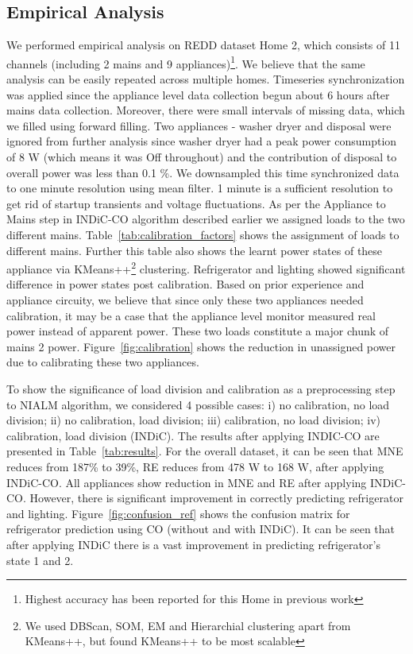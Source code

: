 \documentclass[conference]{IEEEtran}
\newcommand{\figref}[1]{Figure~\ref{#1}}
\newcommand{\tabref}[1]{Table~\ref{#1}}
\begin{document}
\subsection{Empirical Analysis}
\noindent We performed empirical analysis on REDD dataset Home 2, which consists of 11 channels (including 2 mains and 9 appliances)\footnote{Highest accuracy has been reported for this Home in previous work\cite{redd}}. We believe that the same analysis can be easily repeated across multiple homes. Timeseries synchronization was applied since the appliance level data collection begun about 6 hours after mains data collection. Moreover, there were small intervals of missing data, which we filled using forward filling. Two appliances - washer dryer and disposal were ignored from further analysis since washer dryer had a peak power consumption of 8 W (which means it was Off throughout) and the contribution of disposal to overall power was less than 0.1 \%.  We downsampled this time synchronized data to one minute resolution using mean filter. 1 minute is a sufficient resolution to get rid of startup transients and voltage fluctuations. As per the Appliance to Mains step in INDiC-CO algorithm described earlier we assigned loads to the two different mains.  \tabref{tab:calibration_factors} shows the assignment of loads to different mains. Further this table also shows the learnt power states of these appliance via KMeans++\footnote{We used DBScan, SOM, EM and Hierarchial clustering apart from KMeans++, but found KMeans++ to be most scalable} \cite{kmeansplusplus} clustering. Refrigerator and lighting showed significant difference in power states post calibration. Based on prior experience and appliance circuity\cite{ting2005}, we believe that since only these two appliances needed calibration, it may be a case that the appliance level monitor measured real power instead of apparent power. These two loads constitute a major chunk of mains 2 power. \figref{fig:calibration} shows the reduction in unassigned power due to calibrating these two appliances. 

\noindent To show the significance of load division and calibration as a preprocessing step to NIALM algorithm, we considered 4 possible cases:  i) no calibration, no load division; ii) no calibration, load division; iii) calibration, no load division; iv) calibration, load division (INDiC). The results after applying INDIC-CO are presented in \tabref{tab:results}. For the overall dataset, it can be seen that MNE reduces from 187\% to 39\%, RE reduces from 478 W to 168 W, after applying INDiC-CO. All appliances show reduction in MNE and RE after applying INDiC-CO. However, there is significant improvement in correctly predicting refrigerator and lighting. \figref{fig:confusion_ref} shows the confusion matrix for refrigerator prediction using CO (without and with INDiC). It can be seen that after applying INDiC there is a vast improvement in predicting refrigerator's state 1 and 2.
%
\end{document}

